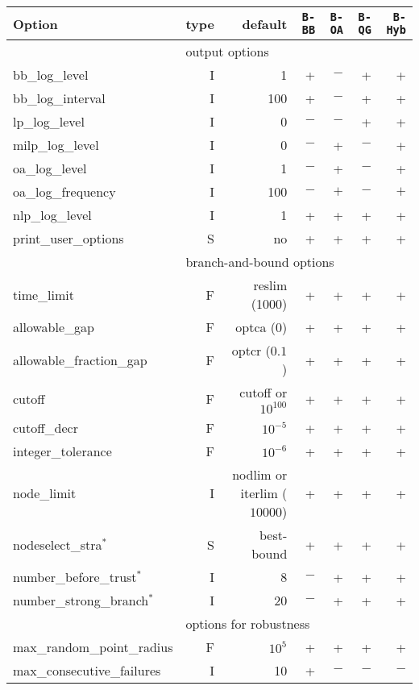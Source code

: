 \begin{table}[!ht]
\begin{center}
\begin{tabular}{|l|r|r|r|r|r|r|}
\hline
Option & type &  default & {\tt B-BB} & {\tt B-OA} & {\tt B-QG} & {\tt B-Hyb} \\
\hline
\multicolumn{1}{|c}{} & \multicolumn{6}{l|}{output options}\\
\hline
bb\_log\_level & I & 1 & + & $-$  & + & +\\
bb\_log\_interval & I & 100 & + & $-$ & + & +\\
lp\_log\_level & I & 0 & $-$ & $-$ & + & +\\
milp\_log\_level & I &  0 & $-$ &  + & $-$ & +\\
oa\_log\_level & I & 1 & $-$ &  + & $-$ & +\\
oa\_log\_frequency & I & 100 & $ - $ & $+$ & $-$ & $+$\\
nlp\_log\_level & I & 1 & +&  + & + & +\\
print\_user\_options & S & no & + & + & + & +\\
\hline
\multicolumn{1}{|c}{} & \multicolumn{6}{l|}{branch-and-bound options}\\
\hline
time\_limit & F & reslim (1000) & + & + & + & +\\
allowable\_gap  & F & optca (0) & + & + & + & +\\
allowable\_fraction\_gap & F & optcr ($0.1$)& +& + & +& +\\
cutoff & F& cutoff or $10^{100}$ &  + & +& +& +\\
cutoff\_decr & F & $10^{-5}$ & + & + & + & +\\
integer\_tolerance & F & $10^{-6}$ &  + & + & + & +\\
node\_limit & I & nodlim or iterlim ($10000$) &  + & +& + & + \\
nodeselect\_stra$^*$ & S & best-bound & + & + & +& +\\
number\_before\_trust$^*$ & I & 8 & $-$ & + & + & +\\
number\_strong\_branch$^*$ & I & 20 & $-$ & + & + &+ \\
\hline
\multicolumn{1}{|c}{} & \multicolumn{6}{l|}{options for robustness}\\
\hline
max\_random\_point\_radius & F & $10^5$  &+ &+ &+ &+\\
max\_consecutive\_failures & I & 10 & + & $-$ & $-$ & $-$\\

\end{tabular}
\end{center}
\end{table}
